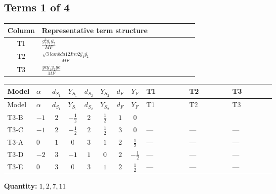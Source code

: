 \documentclass[8pt]{article}
\begin{document}
\begin{landscape}
\subsection*{Terms 1 of 4}
\begin{center}
\begin{tabular}{@{}c >{\raggedright\arraybackslash}p{0.82\linewidth}@{}}
\toprule
Column & Representative term structure \\
\midrule
T1 & \(\displaystyle \frac{g_{2}^{2} \overline{y_{1}} \overline{y_{2}}}{MF}\) \\
\midrule
T2 & \(\displaystyle \frac{\sqrt{3} lambda12Inv2 \overline{y_{1}} \overline{y_{2}}}{MF}\) \\
\midrule
T3 & \(\displaystyle \frac{ye \overline{y_{1}} \overline{y_{2}} \overline{ye}}{MF}\) \\
\midrule
\bottomrule
\end{tabular}
\end{center}
\smallskip
\tiny
\begin{longtable}{@{}llcccccc >{\raggedright\arraybackslash}p{0.21\linewidth} >{\raggedright\arraybackslash}p{0.21\linewidth} >{\raggedright\arraybackslash}p{0.21\linewidth}@{}}
\toprule
Model & $\alpha$ & $d_{S_1}$ & $Y_{S_1}$ & $d_{S_2}$ & $Y_{S_2}$ & $d_F$ & $Y_F$ & T1 & T2 & T3 \\
\midrule
\endfirsthead
\toprule
Model & $\alpha$ & $d_{S_1}$ & $Y_{S_1}$ & $d_{S_2}$ & $Y_{S_2}$ & $d_F$ & $Y_F$ & T1 & T2 & T3 \\
\midrule
\endhead
T3-B & $-1$ & $2$ & $-\frac{1}{2}$ & $2$ & $\frac{1}{2}$ & $1$ & $0$ & \scriptsize\adjustbox{max width=\linewidth}{$\begin{gathered} - \frac{3 g_{2}^{2} \overline{y_{1}} \overline{y_{2}}}{8 MF}\end{gathered}$} & \scriptsize\adjustbox{max width=\linewidth}{$\begin{gathered} - \frac{\sqrt{3} lambda12Inv2 \overline{y_{1}} \overline{y_{2}}}{6 MF}\end{gathered}$} & \scriptsize\adjustbox{max width=\linewidth}{$\begin{gathered} \frac{ye \overline{y_{1}} \overline{y_{2}} \overline{ye}}{8 MF}\end{gathered}$} \\
\midrule
T3-C & $-1$ & $2$ & $-\frac{1}{2}$ & $2$ & $\frac{1}{2}$ & $3$ & $0$ & --- & --- & --- \\
\midrule
T3-A & $0$ & $1$ & $0$ & $3$ & $1$ & $2$ & $\frac{1}{2}$ & --- & --- & --- \\
\midrule
T3-D & $-2$ & $3$ & $-1$ & $1$ & $0$ & $2$ & $-\frac{1}{2}$ & --- & --- & --- \\
\midrule
T3-E & $0$ & $3$ & $0$ & $3$ & $1$ & $2$ & $\frac{1}{2}$ & --- & --- & --- \\
\midrule
\bottomrule
\end{longtable}
\clearpage
\noindent\textbf{Quantity: }$\mathrm{1,2,7,11}$\par\smallskip

\end{landscape}
\end{document}
